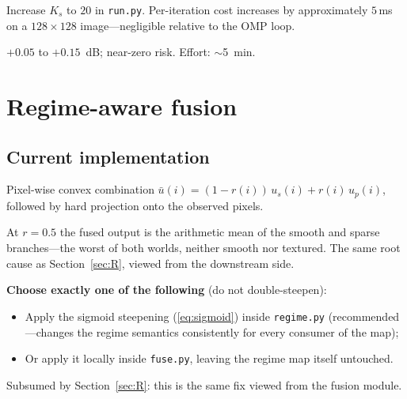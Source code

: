 \documentclass[11pt,a4paper]{article}
\begin{document}
\begin{fixbox}
Increase $K_s$ to $20$ in \texttt{run.py}. Per-iteration cost increases
by approximately $5$\,ms on a $128\times128$ image---negligible relative
to the OMP loop.
\end{fixbox}

\begin{impactbox}
$+0.05$ to $+0.15$~dB; near-zero risk. Effort: $\sim$5~min.
\end{impactbox}

\section{Regime-aware fusion}\label{sec:fuse}

\subsection*{Current implementation}

Pixel-wise convex combination
$\bar u(i) = (1 - r(i))\,u_s(i) + r(i)\,u_p(i)$, followed by hard
projection onto the observed pixels.

\begin{issuebox}
At $r = 0.5$ the fused output is the arithmetic mean of the smooth and
sparse branches---the worst of both worlds, neither smooth nor textured.
The same root cause as Section~\ref{sec:R}, viewed from the downstream
side.
\end{issuebox}

\begin{fixbox}
\textbf{Choose exactly one of the following} (do not double-steepen):
\begin{itemize}
    \item Apply the sigmoid steepening (\ref{eq:sigmoid}) inside
    \texttt{regime.py} (recommended---changes the regime semantics
    consistently for every consumer of the map);
    \item Or apply it locally inside \texttt{fuse.py}, leaving the regime
    map itself untouched.
\end{itemize}
\end{fixbox}

\begin{impactbox}
Subsumed by Section~\ref{sec:R}: this is the same fix viewed from the
fusion module.
\end{impactbox}
\end{document}
